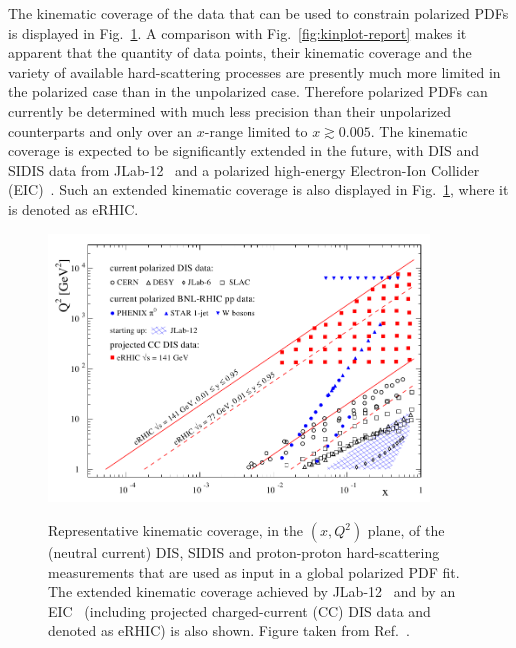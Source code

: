 The kinematic coverage of the data that can be used to constrain polarized 
PDFs is displayed in Fig.~\ref{fig:kinEIC}.
%
A comparison with Fig.~\ref{fig:kinplot-report} makes it apparent that the
quantity of data points, their kinematic coverage and the variety of 
available hard-scattering processes are presently much more limited in the 
polarized case than in the unpolarized case.
%
Therefore polarized PDFs can currently be determined with much less 
precision than their unpolarized counterparts and only over an $x$-range limited
to $x\gtrsim 0.005$.
%
The kinematic coverage is expected to be significantly extended in the future,
with DIS and SIDIS data from JLab-12~\cite{Dudek:2012vr} and a polarized 
high-energy Electron-Ion Collider (EIC)~\cite{Accardi:2012qut}.
%
Such an extended kinematic coverage is also displayed in Fig.~\ref{fig:kinEIC},
where it is denoted as eRHIC.

\begin{figure}[!t]
\centering
\includegraphics[width=0.9\textwidth]{plots/kinEIC}\\
\caption{\small Representative kinematic coverage, in the $(x,Q^2)$ plane,
of the (neutral current) DIS, SIDIS and proton-proton hard-scattering 
measurements that are used as input in a global polarized PDF fit.
%
The extended kinematic coverage achieved by 
JLab-12~\cite{Dudek:2012vr} and by an EIC~\cite{Accardi:2012qut}
(including projected charged-current (CC) DIS data and denoted as eRHIC) 
is also shown.
%
Figure taken from Ref.~\cite{Aschenauer:2014cki}.}
\label{fig:kinEIC}
\end{figure}

